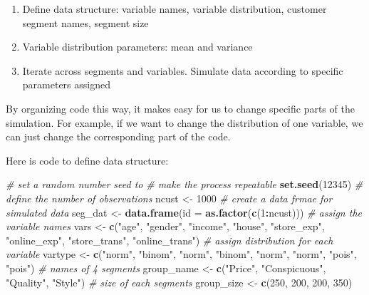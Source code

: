 \documentclass[12pt,]{krantz}
\makeatletter
\newenvironment{Shaded}{\begin{snugshade}}{\end{snugshade}}
\newcommand{\CommentTok}[1]{\textcolor[rgb]{0.37,0.37,0.37}{\textit{#1}}}
\newcommand{\DataTypeTok}[1]{\textcolor[rgb]{0.27,0.27,0.27}{#1}}
\newcommand{\DecValTok}[1]{\textcolor[rgb]{0.06,0.06,0.06}{#1}}
\newcommand{\KeywordTok}[1]{\textcolor[rgb]{0.27,0.27,0.27}{\textbf{#1}}}
\newcommand{\NormalTok}[1]{#1}
\newcommand{\OperatorTok}[1]{\textcolor[rgb]{0.43,0.43,0.43}{\textbf{#1}}}
\newcommand{\StringTok}[1]{\textcolor[rgb]{0.5,0.5,0.5}{#1}}
\providecommand{\tightlist}{%
  \setlength{\itemsep}{0pt}\setlength{\parskip}{0pt}}
\newenvironment{kframe}{%
\medskip{}
\setlength{\fboxsep}{.8em}
 \def\at@end@of@kframe{}%
 \ifinner\ifhmode%
  \def\at@end@of@kframe{\end{minipage}}%
  \begin{minipage}{\columnwidth}%
 \fi\fi%
 \def\FrameCommand##1{\hskip\@totalleftmargin \hskip-\fboxsep
 \colorbox{shadecolor}{##1}\hskip-\fboxsep
     \hskip-\linewidth \hskip-\@totalleftmargin \hskip\columnwidth}%
 \MakeFramed {\advance\hsize-\width
   \@totalleftmargin\z@ \linewidth\hsize
   \@setminipage}}%
 {\par\unskip\endMakeFramed%
 \at@end@of@kframe}
\renewenvironment{Shaded}{\begin{kframe}}{\end{kframe}}
\makeatother
\begin{document}
\begin{enumerate}
\def\labelenumi{\arabic{enumi}.}
\tightlist
\item
  Define data structure: variable names, variable distribution, customer segment names, segment size
\item
  Variable distribution parameters: mean and variance
\item
  Iterate across segments and variables. Simulate data according to specific parameters assigned
\end{enumerate}

By organizing code this way, it makes easy for us to change specific parts of the simulation. For example, if we want to change the distribution of one variable, we can just change the corresponding part of the code.

Here is code to define data structure:

\begin{Shaded}
\begin{Highlighting}[]
\CommentTok{# set a random number seed to }
\CommentTok{# make the process repeatable}
\KeywordTok{set.seed}\NormalTok{(}\DecValTok{12345}\NormalTok{)}
\CommentTok{# define the number of observations}
\NormalTok{ncust <-}\StringTok{ }\DecValTok{1000}
\CommentTok{# create a data frmae for simulated data}
\NormalTok{seg_dat <-}\StringTok{ }\KeywordTok{data.frame}\NormalTok{(}\DataTypeTok{id =} \KeywordTok{as.factor}\NormalTok{(}\KeywordTok{c}\NormalTok{(}\DecValTok{1}\OperatorTok{:}\NormalTok{ncust)))}
\CommentTok{# assign the variable names}
\NormalTok{vars <-}\StringTok{ }\KeywordTok{c}\NormalTok{(}\StringTok{"age"}\NormalTok{, }\StringTok{"gender"}\NormalTok{, }\StringTok{"income"}\NormalTok{, }\StringTok{"house"}\NormalTok{, }\StringTok{"store_exp"}\NormalTok{, }
    \StringTok{"online_exp"}\NormalTok{, }\StringTok{"store_trans"}\NormalTok{, }\StringTok{"online_trans"}\NormalTok{)}
\CommentTok{# assign distribution for each variable}
\NormalTok{vartype <-}\StringTok{ }\KeywordTok{c}\NormalTok{(}\StringTok{"norm"}\NormalTok{, }\StringTok{"binom"}\NormalTok{, }\StringTok{"norm"}\NormalTok{, }\StringTok{"binom"}\NormalTok{, }\StringTok{"norm"}\NormalTok{, }\StringTok{"norm"}\NormalTok{, }
    \StringTok{"pois"}\NormalTok{, }\StringTok{"pois"}\NormalTok{)}
\CommentTok{# names of 4 segments}
\NormalTok{group_name <-}\StringTok{ }\KeywordTok{c}\NormalTok{(}\StringTok{"Price"}\NormalTok{, }\StringTok{"Conspicuous"}\NormalTok{, }\StringTok{"Quality"}\NormalTok{, }\StringTok{"Style"}\NormalTok{)}
\CommentTok{# size of each segments}
\NormalTok{group_size <-}\StringTok{ }\KeywordTok{c}\NormalTok{(}\DecValTok{250}\NormalTok{, }\DecValTok{200}\NormalTok{, }\DecValTok{200}\NormalTok{, }\DecValTok{350}\NormalTok{)}
\end{Highlighting}
\end{Shaded}
\end{document}

